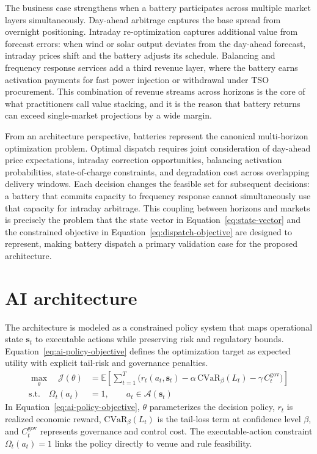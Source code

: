 \documentclass[oneside,10pt]{swissi}
\begin{document}
The business case strengthens when a battery participates across multiple market layers simultaneously. Day-ahead arbitrage captures the base spread from overnight positioning. Intraday re-optimization captures additional value from forecast errors: when wind or solar output deviates from the day-ahead forecast, intraday prices shift and the battery adjusts its schedule. Balancing and frequency response services add a third revenue layer, where the battery earns activation payments for fast power injection or withdrawal under TSO procurement.\cite{eu_reg_2017_2195_ebgl,entsoe_picasso_2026,entsoe_mari_2026} This combination of revenue streams across horizons is the core of what practitioners call value stacking, and it is the reason that battery returns can exceed single-market projections by a wide margin.

From an architecture perspective, batteries represent the canonical multi-horizon optimization problem. Optimal dispatch requires joint consideration of day-ahead price expectations, intraday correction opportunities, balancing activation probabilities, state-of-charge constraints, and degradation cost across overlapping delivery windows. Each decision changes the feasible set for subsequent decisions: a battery that commits capacity to frequency response cannot simultaneously use that capacity for intraday arbitrage. This coupling between horizons and markets is precisely the problem that the state vector in Equation~\eqref{eq:state-vector} and the constrained objective in Equation~\eqref{eq:dispatch-objective} are designed to represent, making battery dispatch a primary validation case for the proposed architecture.

\section{AI architecture}
The architecture is modeled as a constrained policy system that maps operational state $\mathbf{s}_t$ to executable actions while preserving risk and regulatory bounds. Equation~\eqref{eq:ai-policy-objective} defines the optimization target as expected utility with explicit tail-risk and governance penalties.
\begin{align}
\max_{\theta}\quad
\mathcal{J}(\theta) &= \mathbb{E}\!\left[\sum_{t=1}^{T}\Big(r_t\!\left(a_t,\mathbf{s}_t\right)
- \alpha\,\mathrm{CVaR}_{\beta}(L_t)
- \gamma\,C_t^{\mathrm{gov}}\Big)\right]
\label{eq:ai-policy-objective}\\
\text{s.t.}\quad
\Omega_t(a_t) &= 1,\qquad a_t \in \mathcal{A}(\mathbf{s}_t) \nonumber
\end{align}
In Equation~\eqref{eq:ai-policy-objective}, $\theta$ parameterizes the decision policy, $r_t$ is realized economic reward, $\mathrm{CVaR}_{\beta}(L_t)$ is the tail-loss term at confidence level $\beta$, and $C_t^{\mathrm{gov}}$ represents governance and control cost. The executable-action constraint $\Omega_t(a_t)=1$ links the policy directly to venue and rule feasibility.\cite{rockafellar_uryasev_2000_cvar,eu_reg_2011_1227_remit,eu_dir_2014_65_mifid2,eu_reg_2014_600_mifir,eu_reg_2012_648_emir}
\end{document}

